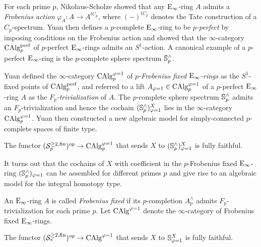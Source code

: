 For each prime $p$, Nikolaus-Scholze \cite{Nikolaus-Scholze} showed that any $\operatorname{E}_{\infty}$-ring $A$ admits a \emph{Frobenius action} $\varphi_{A}:A \to A^{tC_{p}}$, where $(-)^{tC_p}$ denotes the Tate construction of a $C_p$-spectrum.
Yuan \cite{Yuan} then defines a $p$-complete $\operatorname{E}_\infty$-ring to be \emph{$p$-perfect} by imposing conditions on the Frobenius action and showed that the $\infty$-category $\operatorname{CAlg}_p^{\operatorname{perf}}$ of $p$-perfect $\operatorname{E}_\infty$-rings
admits an $S^1$-action.
A canonical example of a $p$-perfect $\operatorname{E}_{\infty}$-ring is the $p$-complete sphere spectrum ${\mathbb{S}}^{\wedge}_p$.

Yuan defined the $\infty$-category $\operatorname{CAlg}_{p}^{\varphi=1}$ of \emph{$p$-Frobenius fixed $\operatorname{E}_{\infty}$-rings} as the $S^1$-fixed points of $\operatorname{CAlg}_p^{\operatorname{perf}}$, and referred to a lift $A_{\varphi=1}\in \operatorname{CAlg}_{p}^{\varphi=1}$ of a
$p$-perfect $\operatorname{E}_{\infty}$-ring $A$ as the \emph{$F_p$-trivialization} of $A$.
The $p$-complete sphere spectrum ${\mathbb{S}}^{\wedge}_p$ admits an $F_p$-trivialization and hence the cochain $({\mathbb{S}}^{\wedge}_{p})_{\varphi=1}^{X}$ lies in the $\infty$-category $\operatorname{CAlg}_{p}^{\varphi=1} $.
Yuan then constructed a new algebraic model for simply-connected $p$-complete spaces of finite type.
\begin{theorem}
    \cite[Theorem B]{Yuan}
    The functor $
    ({\mathcal{S}}^{\geq 2, \operatorname{fin}}_p)^{op} 
    \to 
    \operatorname{CAlg}_{p}^{\varphi=1} 
    $ that sends $X$ to $({\mathbb{S}}^{\wedge}_{p})_{\varphi=1}^{X}$ is fully faithful.
\end{theorem}

It turns out that the cochains of $X$ with coefficient in the $p$-Frobenius fixed $\operatorname{E}_\infty$-ring $({\mathbb{S}}^{\wedge}_{p})_{\varphi=1}$ can be assembled for different primes $p$ and give rise to an algebraic model for the integral homotopy type.

An $\operatorname{E}_{\infty}$-ring $A$ is called \emph{Frobenius fixed} if its $p$-completion $A^{\wedge}_{p}$ admits $F_p$-trivialization for each prime $p$. Let $\operatorname{CAlg}^{\varphi=1}$ denote the $\infty$-category of Frobenius fixed $\operatorname{E}_\infty$-rings.
\begin{theorem}
    \cite[Theorem C]{Yuan}
    The functor $
    ({\mathcal{S}}_{*}^{\geq 2, \operatorname{fin}})^{op} 
    \to 
    \operatorname{CAlg}^{\varphi=1} 
    $ that sends $X$ to ${\mathbb{S}}_{\varphi=1}^{X}$ is fully faithful.
\end{theorem}

